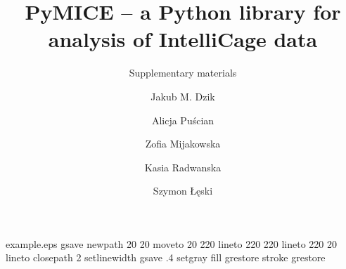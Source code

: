 %
%
%
%
%
\begin{filecontents*}{example.eps}
gsave
newpath
  20 20 moveto
  20 220 lineto
  220 220 lineto
  220 20 lineto
closepath
2 setlinewidth
gsave
  .4 setgray fill
grestore
stroke
grestore
\end{filecontents*}
%
\RequirePackage{fix-cm}
%
\documentclass[smallextended]{svjour3}       %
%
\smartqed  %
%
\usepackage{graphicx}
%
%
\usepackage[T1]{fontenc}
\usepackage[utf8]{inputenc}
\usepackage{upquote,textcomp}
\usepackage{hyperref}
\newcommand{\code}[1]{\texttt{#1}}

%



\title{PyMICE -- a Python library for analysis of IntelliCage data
}
\subtitle{Supplementary materials}


\author{Jakub M. Dzik \and
        Alicja Puścian \and
        Zofia Mijakowska \and
        Kasia Radwanska \and
        Szymon Łęski
}

